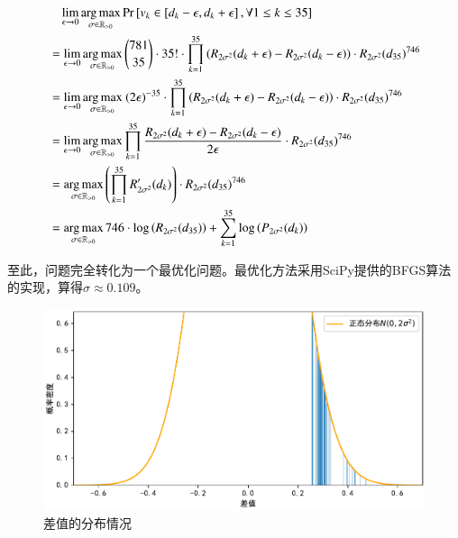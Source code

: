             \begin{align*}
                &\phantom{=\ }\lim\limits_{\epsilon\to 0} \argmax\limits_{\sigma\in\mathbb{R}_{>0}} \mathrm{Pr}\left[v_k\in\left[d_k-\epsilon,d_k+\epsilon\right],\forall 1\leq k\leq 35\right] \\
                &=\lim\limits_{\epsilon\to 0} \argmax\limits_{\sigma\in\mathbb{R}_{>0}} \binom{781}{35}\cdot 35!\cdot\prod\limits_{k=1}^{35} \left(R_{2\sigma^2}(d_k+\epsilon)-R_{2\sigma^2}(d_k-\epsilon)\right)\cdot R_{2\sigma^2}(d_{35})^{746} \\
                &=\lim\limits_{\epsilon\to 0} \argmax\limits_{\sigma\in\mathbb{R}_{>0}} \ (2\epsilon)^{-35}\cdot\prod\limits_{k=1}^{35} \left(R_{2\sigma^2}(d_k+\epsilon)-R_{2\sigma^2}(d_k-\epsilon)\right)\cdot R_{2\sigma^2}(d_{35})^{746} \\
                &=\lim\limits_{\epsilon\to 0} \argmax\limits_{\sigma\in\mathbb{R}_{>0}} \prod\limits_{k=1}^{35} \frac{R_{2\sigma^2}(d_k+\epsilon)-R_{2\sigma^2}(d_k-\epsilon)}{2\epsilon}\cdot R_{2\sigma^2}(d_{35})^{746} \\
                &=\argmax\limits_{\sigma\in\mathbb{R}_{>0}} \left(\prod\limits_{k=1}^{35} R^\prime_{2\sigma^2}(d_k)\right)\cdot R_{2\sigma^2}(d_{35})^{746} \\
                &=\argmax\limits_{\sigma\in\mathbb{R}_{>0}} 746\cdot\log\left(R_{2\sigma^2}(d_{35})\right)+\sum\limits_{k=1}^{35} \log\left(P_{2\sigma^2}(d_k)\right) 
            \end{align*}

            至此，问题完全转化为一个最优化问题。最优化方法采用SciPy提供的BFGS算法的实现\cite{scipy_minimize}，算得$\sigma\approx 0.109$。

            \begin{figure}[htbp]
                \centering
                \includegraphics[width=\textwidth]{fig/plottingNormalDistriOfDifference.pdf}
                \caption{差值的分布情况}
                \label{fig:distriOfDifference}
            \end{figure}

